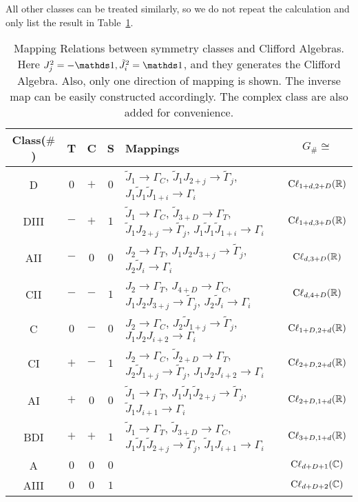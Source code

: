 All other classes can be treated similarly, so we do not repeat the calculation
and only list the result in Table~\ref{tab:map-sym-cl}.
\begin{table}[htpb]
    \centering
    \caption{Mapping Relations between symmetry classes and Clifford Algebras.
    Here $J_j^2=-\id,\tilde{J}_i^2=\id$, and they generates the Clifford
    Algebra. Also, only one direction of mapping is shown. The inverse map can
    be easily constructed accordingly. The complex class are also added for
    convenience.}
    \label{tab:map-sym-cl}
    \begin{tabular}{c | c c c | l | c }
        Class($\#$) & T & C & S & Mappings  & $G_\#\cong $ \\
        \hline 
        D & $0$ & $+$ & $0$ & 
        $\tilde{J}_1\to\Gamma_C$,
        $\tilde{J}_1J_{2+j}\to \tilde{\Gamma}_j$,
        $J_1\tilde{J}_1\tilde{J}_{1+i}\to \Gamma_i$ &
        $\mathrm{C\ell}_{1+d,2+D}(\mathbb{R})$ \\
        DIII & $-$ & $+$ & $1$ & 
        $\tilde{J}_1\to\Gamma_C$, $\tilde{J}_{3+D}\to\Gamma_T$,
        $\tilde{J}_1J_{2+j}\to \tilde{\Gamma}_j$,
        $J_1\tilde{J}_1\tilde{J}_{1+i}\to \Gamma_i$ &
        $\mathrm{C\ell}_{1+d,3+D}(\mathbb{R})$ \\
        AII & $-$ & $0$ & $0$ & 
        $J_2\to \Gamma_T$,
        $J_1J_2J_{3+j}\to \tilde{\Gamma}_j$,
        $J_2\tilde{J}_i \to \Gamma_i$
        & $\mathrm{C\ell}_{d,3+D}(\mathbb{R})$ \\
        CII & $-$ & $-$ & $1$ & 
        $J_2\to \Gamma_T$, $J_{4+D}\to \Gamma_C$,
        $J_1J_2J_{3+j}\to \tilde{\Gamma}_j$,
        $J_2\tilde{J}_i \to \Gamma_i$
        & $\mathrm{C\ell}_{d,4+D}(\mathbb{R})$ \\
        C & $0$ & $-$ & $0$ & 
        $J_2\to \Gamma_C$, 
        $J_2\tilde{J}_{1+j} \to \tilde{\Gamma}_j$,
        $J_1J_2J_{i+2}\to \Gamma_i$
        & $\mathrm{C\ell}_{1+D,2+d}(\mathbb{R})$ \\
        CI & $+$ & $-$ & $1$ & 
        $J_2\to \Gamma_C$, $\tilde{J}_{2+D}\to \Gamma_T$,
        $J_2\tilde{J}_{1+j} \to \tilde{\Gamma}_j$,
        $J_1J_2J_{i+2}\to \Gamma_i$
        & $\mathrm{C\ell}_{2+D,2+d}(\mathbb{R})$ \\
        AI & $+$ & $0$ & $0$ & 
        $\tilde{J}_1\to \Gamma_T$,
        $J_1\tilde{J}_1\tilde{J}_{2+j} \to \tilde{\Gamma}_j$,
        $\tilde{J}_1J_{i+1} \to \Gamma_i$
        & $\mathrm{C\ell}_{2+D,1+d}(\mathbb{R})$ \\
        BDI & $+$ & $+$ & $1$ & 
        $\tilde{J}_1\to \Gamma_T$, $\tilde{J}_{3+D}\to \Gamma_C$,
        $J_1\tilde{J}_1\tilde{J}_{2+j} \to \tilde{\Gamma}_j$,
        $\tilde{J}_1J_{i+1} \to \Gamma_i$
        & $\mathrm{C\ell}_{3+D,1+d}(\mathbb{R})$ \\
        \hline
        A & $0$ & $0$ & $0$ & 
        & $\mathrm{C\ell}_{d+D+1}(\mathbb{C})$ \\
        AIII & $0$ & $0$ & $1$ & 
        & $\mathrm{C\ell}_{d+D+2}(\mathbb{C})$ \\
        \hline
    \end{tabular}
\end{table}
